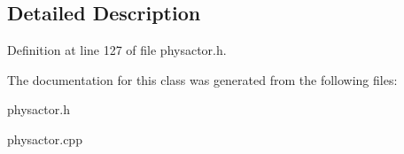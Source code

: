 \subsection{Detailed Description}


Definition at line 127 of file physactor.h.

The documentation for this class was generated from the following files:\begin{DoxyCompactItemize}
\item 
physactor.h\item 
physactor.cpp\end{DoxyCompactItemize}
